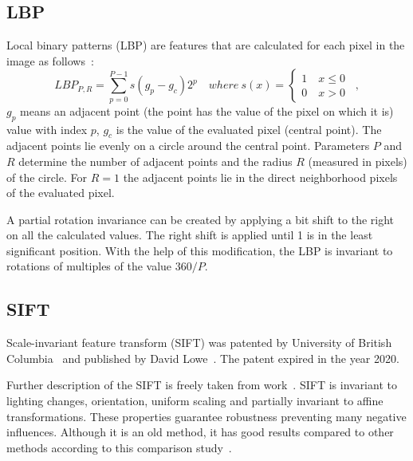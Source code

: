 \documentclass[thesis=B,english]{FITthesis}[2019/12/23]
\begin{document}
        \subsection{LBP}
            Local binary patterns (LBP) are features that are calculated for each pixel in the image as follows~\cite{5427137}:
            \begin{equation}
                LBP_{P,R} = \sum_{p=0}^{P-1} s\left(g_p - g_c\right) 2^p\quad where\ s(x) =
                \begin{cases}
                    1\quad x \leq 0\\
                    0\quad x > 0
                \end{cases} \enspace ,
            \end{equation} \label{eq:LBP}
            \(g_p\) means an adjacent point (the point has the value of the pixel on which it is) value with index \(p\), \(g_c\) is the value of the evaluated pixel (central point). The adjacent points lie evenly on a circle around the central point. Parameters \(P\) and \(R\) determine the number of adjacent points and the radius \(R\) (measured in pixels) of the circle. For \(R=1\) the adjacent points lie in the direct neighborhood pixels of the evaluated pixel.
            
            A partial rotation invariance can be created by applying a bit shift to the right on all the calculated values. The right shift is applied until 1 is in the least significant position. With the help of this modification, the LBP is invariant to rotations of multiples of the value \(360/P\).
            
        \subsection{SIFT}
            Scale-invariant feature transform (SIFT) was patented by University of British Columbia~\cite{lowe2004method} and published by David Lowe~\cite{lowe1999object}. The patent expired in the year 2020.
        
            Further description of the SIFT is freely taken from work~\cite{5734842}. SIFT is invariant to lighting changes, orientation, uniform scaling and partially invariant to affine transformations. These properties guarantee robustness preventing many negative influences. Although it is an old method, it has good results compared to other methods according to this comparison study~\cite{1498756}.
                            
\end{document}
